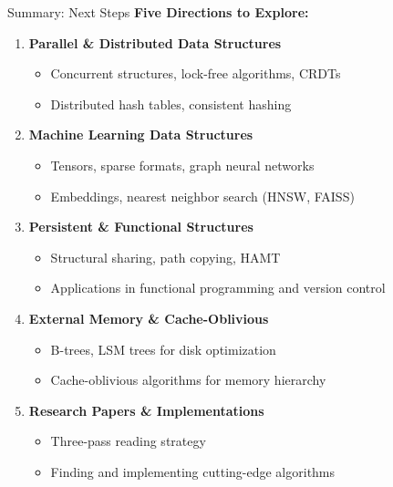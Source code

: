 \documentclass[aspectratio=169,xcolor=dvipsnames]{beamer}
\begin{document}
\begin{frame}{Summary: Next Steps}
  \textbf{Five Directions to Explore:}

  \vspace{0.3cm}
  \begin{enumerate}
    \item \textbf{Parallel \& Distributed Data Structures}
    \begin{itemize}
      \item Concurrent structures, lock-free algorithms, CRDTs
      \item Distributed hash tables, consistent hashing
    \end{itemize}

    \vspace{0.2cm}
    \item \textbf{Machine Learning Data Structures}
    \begin{itemize}
      \item Tensors, sparse formats, graph neural networks
      \item Embeddings, nearest neighbor search (HNSW, FAISS)
    \end{itemize}

    \vspace{0.2cm}
    \item \textbf{Persistent \& Functional Structures}
    \begin{itemize}
      \item Structural sharing, path copying, HAMT
      \item Applications in functional programming and version control
    \end{itemize}

    \vspace{0.2cm}
    \item \textbf{External Memory \& Cache-Oblivious}
    \begin{itemize}
      \item B-trees, LSM trees for disk optimization
      \item Cache-oblivious algorithms for memory hierarchy
    \end{itemize}

    \vspace{0.2cm}
    \item \textbf{Research Papers \& Implementations}
    \begin{itemize}
      \item Three-pass reading strategy
      \item Finding and implementing cutting-edge algorithms
    \end{itemize}
  \end{enumerate}
\end{frame}
\end{document}
